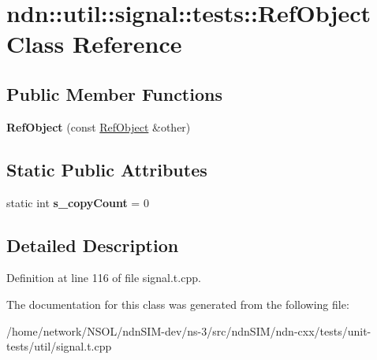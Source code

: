 \hypertarget{classndn_1_1util_1_1signal_1_1tests_1_1RefObject}{}\section{ndn\+:\+:util\+:\+:signal\+:\+:tests\+:\+:Ref\+Object Class Reference}
\label{classndn_1_1util_1_1signal_1_1tests_1_1RefObject}
\subsection*{Public Member Functions}
\begin{DoxyCompactItemize}
\item 
{\bfseries Ref\+Object} (const \hyperlink{classndn_1_1util_1_1signal_1_1tests_1_1RefObject}{Ref\+Object} \&other)\hypertarget{classndn_1_1util_1_1signal_1_1tests_1_1RefObject_a40ded4510e0751a1036262ec5508dd62}{}\label{classndn_1_1util_1_1signal_1_1tests_1_1RefObject_a40ded4510e0751a1036262ec5508dd62}

\end{DoxyCompactItemize}
\subsection*{Static Public Attributes}
\begin{DoxyCompactItemize}
\item 
static int {\bfseries s\+\_\+copy\+Count} = 0\hypertarget{classndn_1_1util_1_1signal_1_1tests_1_1RefObject_aed7a44478916367b83bbbf8fbefb6354}{}\label{classndn_1_1util_1_1signal_1_1tests_1_1RefObject_aed7a44478916367b83bbbf8fbefb6354}

\end{DoxyCompactItemize}


\subsection{Detailed Description}


Definition at line 116 of file signal.\+t.\+cpp.



The documentation for this class was generated from the following file\+:\begin{DoxyCompactItemize}
\item 
/home/network/\+N\+S\+O\+L/ndn\+S\+I\+M-\/dev/ns-\/3/src/ndn\+S\+I\+M/ndn-\/cxx/tests/unit-\/tests/util/signal.\+t.\+cpp\end{DoxyCompactItemize}
